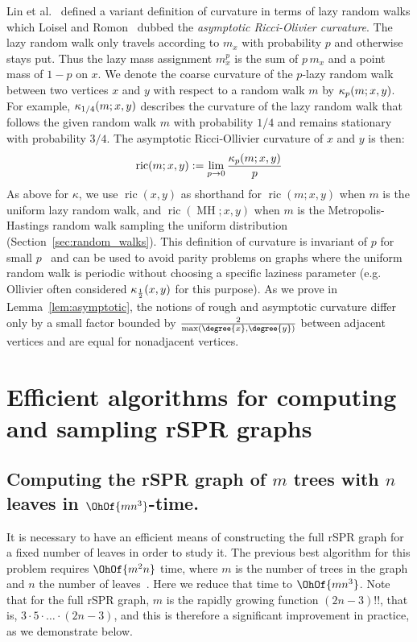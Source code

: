 \documentclass[10pt,twoside,leqno,twocolumn]{article}
\newcommand{\MH}{\operatorname{MH}}
\newcommand{\curvature}[2][]{%
    \ifthenelse{\equal{#1}{}}%
		{\kappa(#2)}%
		{\kappa_{#1}(#2)}%
}
\newcommand{\ric}[1]{
	\operatorname{ric}(#1)%
}
\begin{document}
Lin et al.~\cite{lin2011ricci} defined a variant definition of curvature in terms of lazy random walks which Loisel and Romon~\cite{Loisel2014-hu} dubbed the \emph{asymptotic Ricci-Olivier curvature}.
The lazy random walk only travels according to $m_x$ with probability $p$ and otherwise stays put.
Thus the lazy mass assignment $m^p_x$ is the sum of $p\, m_x$ and a point mass of $1 - p$ on $x$.
We denote the coarse curvature of the $p$-lazy random walk between two vertices $x$ and $y$ with respect to a random walk $m$ by $\curvature[p]{m; x,y}$.
For example, $\curvature[1/4]{m; x,y}$ describes the curvature of the lazy random walk that follows the given random walk $m$ with probability $1/4$ and remains stationary with probability $3/4$.
The asymptotic Ricci-Ollivier curvature of $x$ and $y$ is then:
\begin{equation}
\ric{m; x, y} := \lim_{p \rightarrow 0} \frac{\curvature[p]{m; x,y}}{p}
\label{eq:asympCurvatureDef}
\end{equation}
As above for $\kappa$, we use $\ric{x, y}$ as shorthand for $\ric{m; x, y}$ when $m$ is the uniform lazy random walk, and $\ric{\MH; x, y}$ when $m$ is the Metropolis-Hastings random walk sampling the uniform distribution (Section~\ref{sec:random_walks}).
This definition of curvature is invariant of $p$ for small $p$~\cite{Loisel2014-hu} and can be used to avoid parity problems on graphs where the uniform random walk is periodic without choosing a specific laziness parameter (e.g. Ollivier often considered $\curvature[\frac{1}{2}]{x,y}$ for this purpose).
As we prove in Lemma~\ref{lem:asymptotic}, the notions of rough and asymptotic curvature differ only by a small factor bounded by $\frac{2}{\max(\degree{x}, \degree{y})}$ between adjacent vertices and are equal for nonadjacent vertices.

\section{Efficient algorithms for computing and sampling rSPR graphs}

\subsection{Computing the rSPR graph of $m$ trees with $n$ leaves in $\OhOf{mn^3}$-time.}
\label{sec:computing_treespace}

It is necessary to have an efficient means of constructing the full rSPR graph for a fixed number of leaves in order to study it.
The previous best algorithm for this problem requires $\OhOf{m^2 n}$ time, where $m$ is the number of trees in the graph and $n$ the number of leaves~\cite{Whidden2015-yi}.
Here we reduce that time to $\OhOf{mn^3}$.
Note that for the full rSPR graph, $m$ is the rapidly growing function $(2n-3)!!$, that is, $3 \cdot 5 \cdot \ldots \cdot (2n-3)$, and this is therefore a significant improvement in practice, as we demonstrate below.
\end{document}
